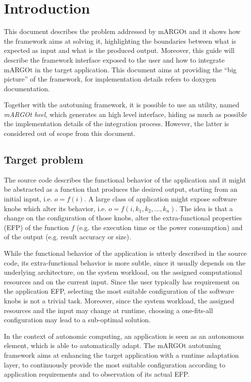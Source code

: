 \section{Introduction}

This document describes the problem addressed by mARGOt and it shows how the framework aims at solving it, highlighting the boundaries between what is expected as input and what is the produced output.
Moreover, this guide will describe the framework interface exposed to the user and how to integrate mARGOt in the target application.
This document aims at providing the ``big picture'' of the framework, for implementation details refers to doxygen documentation.

Together with the autotuning framework, it is possible to use an utility, named \textit{mARGOt heel}, which generates an high level interface, hiding as much as possible the implementation details of the integration process.
However, the latter is considered out of scope from this document.


\subsection{Target problem}


The source code describes the functional behavior of the application and it might be abstracted as a function that produces the desired output, starting from an initial input, i.e. $o = f(i)$.
A large class of application might expose software knobs which alter its behavior, i.e.  $o = f(i,k_1,k_2,\ldots,k_n)$.
The idea is that a change on the configuration of those knobs, alter the extra-functional properties (EFP) of the function $f$ (e.g. the execution time or the power consumption) and of the output (e.g. result accuracy or size).

While the functional behavior of the application is utterly described in the source code, its extra-functional behavior is more subtle, since it usually depends on the underlying architecture, on the system workload, on the assigned computational resources and on the current input.
Since the user typically has requirement on the application EFP, selecting the most suitable configuration of the software knobs is not a trivial task.
Moreover, since the system workload, the assigned resources and the input may change at runtime, choosing a one-fits-all configuration may lead to a sub-optimal solution.

In the context of autonomic computing, an application is seen as an autonomous element, which is able to automatically adapt.
The mARGOt autotuning framework aims at enhancing the target application with a runtime adaptation layer, to continuously provide the most suitable configuration according to application requirements and to observation of its actual EFP.


